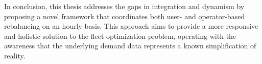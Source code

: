 In conclusion, this thesis addresses the gaps in integration and dynamism by proposing a novel framework that coordinates both user- and operator-based rebalancing on an hourly basis.
This approach aims to provide a more responsive and holistic solution to the fleet optimization problem, operating with the awareness that the underlying demand data represents a known simplification of reality.
\\